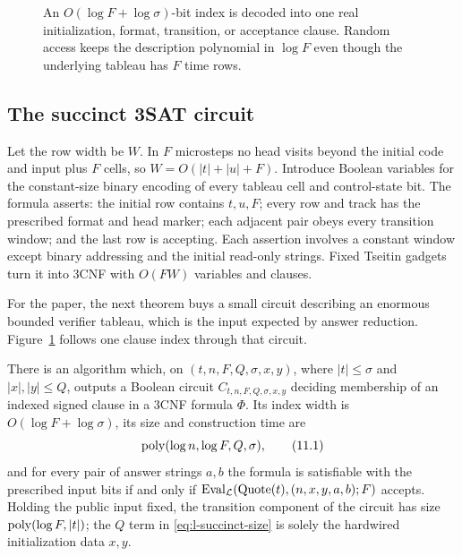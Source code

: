 \begin{figure}[t]
\centering

\caption{An \(O(\log F+\log\sigma)\)-bit index is decoded into one real initialization, format, transition, or acceptance clause.  Random access keeps the description polynomial in \(\log F\) even though the underlying tableau has \(F\) time rows.}
\label{fig:succinct-circuit}
\end{figure}
\subsection{The succinct 3SAT circuit}

Let the row width be \(W\).  In \(F\) microsteps no head visits beyond the
initial code and input plus \(F\) cells, so
\(W=O(|t|+|u|+F)\).  Introduce Boolean variables for the constant-size binary
encoding of every tableau cell and control-state bit.  The formula asserts:
the initial row contains \(t,u,F\); every row and track has the prescribed
format and head marker; each adjacent pair obeys every transition window; and
the last row is accepting.  Each assertion involves a constant window except
binary addressing and the initial read-only strings.  Fixed Tseitin gadgets
turn it into 3CNF with \(O(FW)\) variables and clauses.

For the paper, the next theorem buys a small circuit describing an enormous
bounded verifier tableau, which is the input expected by answer reduction.
Figure~\ref{fig:succinct-circuit} follows one clause index through that circuit.
\begin{theorem}
\label{thm:l-succinct-sat}\enspace%
There is an algorithm which, on
\((t,n,F,Q,\sigma,x,y)\), where \(|t|\leq\sigma\) and \(|x|,|y|\leq Q\),
outputs a Boolean circuit \(C_{t,n,F,Q,\sigma,x,y}\) deciding membership of an
indexed signed clause in a 3CNF formula \(\Phi\).  Its index width is
\(O(\log F+\log\sigma)\), its size and construction time are
\[
 \operatorname{poly}(\log n,\log F,Q,\sigma),
\tag{11.1}\label{eq:l-succinct-size}
\]
and for every pair of answer strings \(a,b\) the formula is satisfiable with
the prescribed input bits if and only if
\(\operatorname{Eval}_{\mathcal L}(\operatorname{Quote}(t),(n,x,y,a,b);F)\) accepts.  Holding the public
input fixed, the transition component of the circuit has size
\(\operatorname{poly}(\log F,|t|)\); the \(Q\) term in \eqref{eq:l-succinct-size} is solely
the hardwired initialization data \(x,y\).
\end{theorem}

